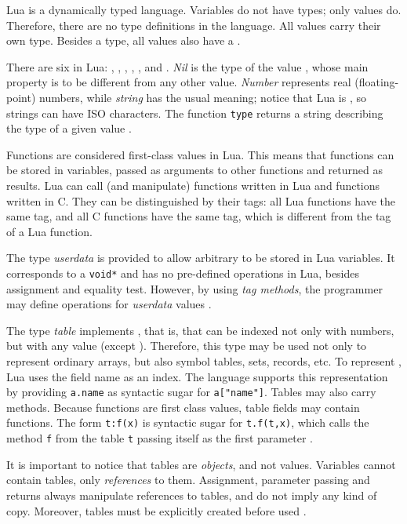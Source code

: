 Lua is a dynamically typed language.
Variables do not have types; only values do.
Therefore, there are no type definitions in the language.
All values carry their own type.
Besides a type, all values also have a .

There are six  in Lua: , ,
, , , and .
\emph{Nil} is the type of the value \nil,
whose main property is to be different from any other value.
\emph{Number} represents real (floating-point) numbers,
while \emph{string} has the usual meaning;
notice that Lua is ,
so strings can have ISO characters.
The function \verb|type| returns a string describing the type
of a given value .

Functions are considered first-class values in Lua.
This means that functions can be stored in variables,
passed as arguments to other functions and returned as results.
Lua can call (and manipulate) functions written in Lua and
functions written in C.
They can be distinguished by their tags:
all Lua functions have the same tag,
and all C functions have the same tag,
which is different from the tag of a Lua function.

The type \emph{userdata} is provided to allow
arbitrary  to be stored in Lua variables.
It corresponds to a \verb|void*| and has no pre-defined operations in Lua,
besides assignment and equality test.
However, by using \emph{tag methods},
the programmer may define operations for \emph{userdata} values
.

The type \emph{table} implements ,
that is,  that can be indexed not only with numbers,
but with any value (except \nil).
Therefore, this type may be used not only to represent ordinary arrays,
but also symbol tables, sets, records, etc.
To represent , Lua uses the field name as an index.
The language supports this representation by
providing \verb|a.name| as syntactic sugar for \verb|a["name"]|.
Tables may also carry methods.
Because functions are first class values,
table fields may contain functions.
The form \verb|t:f(x)| is syntactic sugar for \verb|t.f(t,x)|,
which calls the method \verb|f| from the table \verb|t| passing
itself as the first parameter .

It is important to notice that tables are \emph{objects}, and not values.
Variables cannot contain tables, only \emph{references} to them.
Assignment, parameter passing and returns always manipulate references
to tables, and do not imply any kind of copy.
Moreover, tables must be explicitly created before used
.

